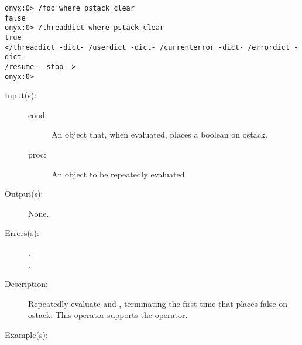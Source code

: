 \begin{description}
\begin{description}
\begin{verbatim}
onyx:0> /foo where pstack clear
false
onyx:0> /threaddict where pstack clear
true
</threaddict -dict- /userdict -dict- /currenterror -dict- /errordict -dict-
/resume --stop-->
onyx:0>
		\end{verbatim}
	\end{description}
\label{systemdict:while}
\item[{\onyxop{cond proc}{while}{--}}: ]
	\begin{description}\item[]
	\item[Input(s): ]
		\begin{description}\item[]
		\item[cond: ]
			An object that, when evaluated, places a boolean on
			ostack.
		\item[proc: ]
			An object to be repeatedly evaluated.
		\end{description}
	\item[Output(s): ] None.
	\item[Errors(s): ]
		\begin{description}\item[]
		\item[.]
		\item[.]
		\end{description}
	\item[Description: ]
		Repeatedly evaluate  and , terminating
		the first time that  places false on ostack.  This
		operator supports the
		 operator.
	\item[Example(s): ]\begin{verbatim}


\end{verbatim}
\end{description}
\end{description}
